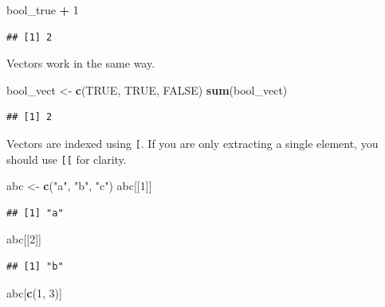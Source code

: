 \documentclass[
  openany]{book}
\newenvironment{Shaded}{\begin{snugshade}}{\end{snugshade}}
\newcommand{\DecValTok}[1]{\textcolor[rgb]{0.00,0.00,0.81}{#1}}
\newcommand{\KeywordTok}[1]{\textcolor[rgb]{0.13,0.29,0.53}{\textbf{#1}}}
\newcommand{\NormalTok}[1]{#1}
\newcommand{\OperatorTok}[1]{\textcolor[rgb]{0.81,0.36,0.00}{\textbf{#1}}}
\newcommand{\OtherTok}[1]{\textcolor[rgb]{0.56,0.35,0.01}{#1}}
\newcommand{\StringTok}[1]{\textcolor[rgb]{0.31,0.60,0.02}{#1}}
\begin{document}
\begin{Shaded}
\begin{Highlighting}[]
\NormalTok{bool_true }\OperatorTok{+}\StringTok{ }\DecValTok{1}
\end{Highlighting}
\end{Shaded}

\begin{verbatim}
## [1] 2
\end{verbatim}

Vectors work in the same way.

\begin{Shaded}
\begin{Highlighting}[]
\NormalTok{bool_vect <-}\StringTok{ }\KeywordTok{c}\NormalTok{(}\OtherTok{TRUE}\NormalTok{, }\OtherTok{TRUE}\NormalTok{, }\OtherTok{FALSE}\NormalTok{)}
\KeywordTok{sum}\NormalTok{(bool_vect)}
\end{Highlighting}
\end{Shaded}

\begin{verbatim}
## [1] 2
\end{verbatim}

Vectors are indexed using \texttt{{[}}. If you are only extracting a single element, you
should use \texttt{{[}{[}} for clarity.

\begin{Shaded}
\begin{Highlighting}[]
\NormalTok{abc <-}\StringTok{ }\KeywordTok{c}\NormalTok{(}\StringTok{"a"}\NormalTok{, }\StringTok{"b"}\NormalTok{, }\StringTok{"c"}\NormalTok{)}
\NormalTok{abc[[}\DecValTok{1}\NormalTok{]]}
\end{Highlighting}
\end{Shaded}

\begin{verbatim}
## [1] "a"
\end{verbatim}

\begin{Shaded}
\begin{Highlighting}[]
\NormalTok{abc[[}\DecValTok{2}\NormalTok{]]}
\end{Highlighting}
\end{Shaded}

\begin{verbatim}
## [1] "b"
\end{verbatim}

\begin{Shaded}
\begin{Highlighting}[]
\NormalTok{abc[}\KeywordTok{c}\NormalTok{(}\DecValTok{1}\NormalTok{, }\DecValTok{3}\NormalTok{)]}
\end{Highlighting}
\end{Shaded}
\end{document}
